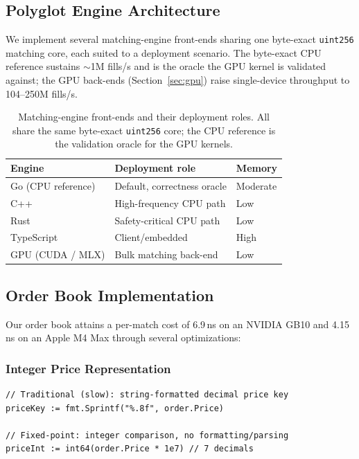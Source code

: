 \documentclass[11pt,a4paper]{article}
\begin{document}
\subsection{Polyglot Engine Architecture}

We implement several matching-engine front-ends sharing one byte-exact
\texttt{uint256} matching core, each suited to a deployment scenario. The
byte-exact CPU reference sustains $\sim$1M fills/s and is the oracle the GPU
kernel is validated against; the GPU back-ends (Section~\ref{sec:gpu}) raise
single-device throughput to 104--250M fills/s.

\begin{table}[H]
\centering
\begin{tabular}{lll}
\toprule
\textbf{Engine} & \textbf{Deployment role} & \textbf{Memory} \\
\midrule
Go (CPU reference) & Default, correctness oracle & Moderate \\
C++ & High-frequency CPU path & Low \\
Rust & Safety-critical CPU path & Low \\
TypeScript & Client/embedded & High \\
GPU (CUDA / MLX) & Bulk matching back-end & Low \\
\bottomrule
\end{tabular}
\caption{Matching-engine front-ends and their deployment roles. All share the
same byte-exact \texttt{uint256} core; the CPU reference is the validation
oracle for the GPU kernels.}
\label{tab:engines}
\end{table}

\subsection{Order Book Implementation}

Our order book attains a per-match cost of 6.9\,ns on an NVIDIA GB10 and
4.15\,ns on an Apple M4 Max through several optimizations:

\subsubsection{Integer Price Representation}
\begin{lstlisting}
// Traditional (slow): string-formatted decimal price key
priceKey := fmt.Sprintf("%.8f", order.Price)

// Fixed-point: integer comparison, no formatting/parsing
priceInt := int64(order.Price * 1e7) // 7 decimals
\end{lstlisting}
\end{document}
